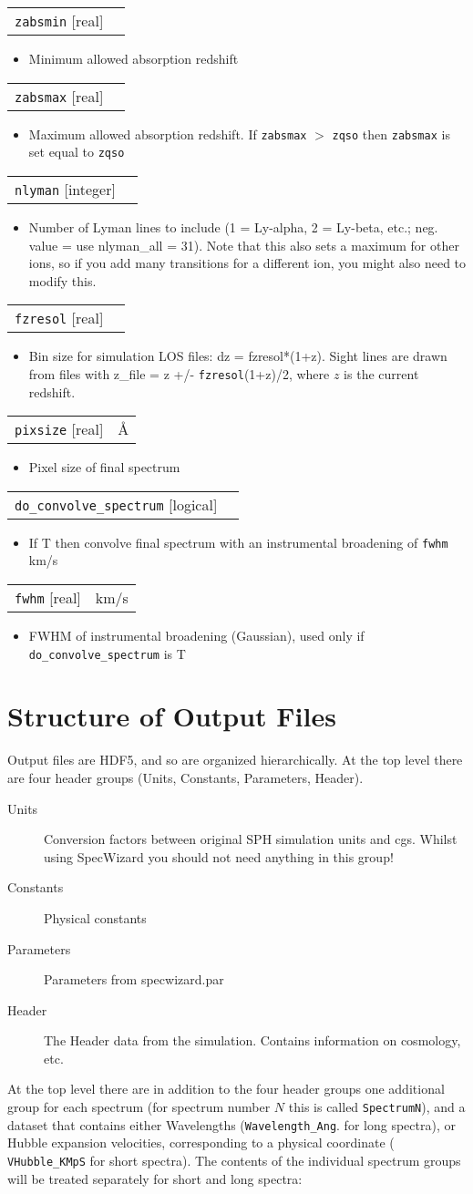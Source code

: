 \documentclass{report}
\makeatletter
\newcommand{\paramdefinition}[3]{
\begin{tabular*}{\textwidth}{l@{\extracolsep{\fill}}r}
		{\tt #1} [{\sc #2}]& #3 \\
\end{tabular*}}
\newcommand{\paramdescription}[1]{
\begin{itemize}
\item #1
\end{itemize}\vspace{0.2cm}}
\makeatother
\begin{document}
\paramdefinition{zabsmin}{real}{}
\paramdescription{Minimum allowed absorption redshift}

\paramdefinition{zabsmax}{real}{}
\paramdescription{Maximum allowed absorption redshift.  If {\tt zabsmax} $>$ {\tt zqso} then {\tt zabsmax} is set equal to {\tt zqso}}

\paramdefinition{nlyman}{integer}{}
\paramdescription{Number of Lyman lines to include (1 = Ly-alpha, 2 = Ly-beta, etc.; neg. value = use nlyman\_all = 31). Note that this also sets a maximum for other ions, so if you add many transitions for a different ion, you might also need to modify this.}

\paramdefinition{fzresol}{real}{}
\paramdescription{Bin size for simulation LOS files: dz = fzresol*(1+z). Sight lines are drawn from files with z\_file = z +/- {\tt fzresol}(1+z)/2, where $z$ is the current redshift.}

\paramdefinition{pixsize}{real}{\AA{}}
\paramdescription{Pixel size of final spectrum}

\paramdefinition{do\_convolve\_spectrum}{logical}{}
\paramdescription{If T then convolve final spectrum with an instrumental broadening of {\tt fwhm} km/s}

\paramdefinition{fwhm}{real}{km/s}
\paramdescription{FWHM of instrumental broadening (Gaussian), used only if {\tt do\_convolve\_spectrum} is T}


\chapter{Structure of Output Files}

Output files are HDF5, and so are organized hierarchically.  At the top level there are four header groups (Units, Constants, Parameters, Header).

\begin{description}
   \item[Units] Conversion factors between original SPH simulation units and cgs.  Whilst using SpecWizard you should not need anything in this group!
   \item[Constants] Physical constants
   \item[Parameters] Parameters from specwizard.par
   \item[Header] The Header data from the simulation.  Contains information on cosmology, etc.
\end{description}  

At the top level there are in addition to the four header groups one
additional group for each spectrum (for spectrum number $N$ this is
called {\tt SpectrumN}), and a dataset that contains either
Wavelengths ({\tt Wavelength\_Ang}. for long spectra), or Hubble
expansion velocities, corresponding to a physical coordinate ({\tt
  VHubble\_KMpS} for short spectra).  The contents of the individual
spectrum groups will be treated separately for short and long spectra:
\end{document}
